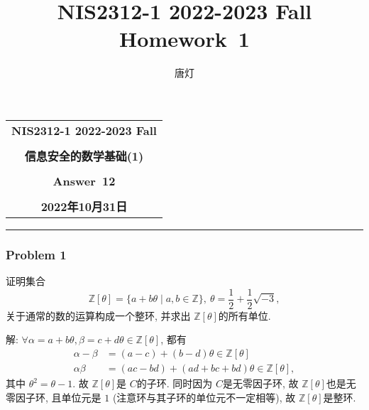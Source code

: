 \documentclass[a4paper,12pt]{ctexart}
\title{NIS2312-1 2022-2023 Fall Homework~1}
\author{唐灯}
\newcommand{\Z}{\mathbb{Z}}
\begin{document}
  \begin{center}

  \vspace{-0.3in}
  \begin{tabular}{c}
    \textbf{\Large NIS2312-1 2022-2023 Fall} \\
    \textbf{\Large  } \\
    \textbf{\Large  信息安全的数学基础(1)} \\
    \textbf{\Large  } \\
    \textbf{\Large  Answer~12} \\
    \textbf{\Large  } \\
    \textbf{\Large 2022年10月31日} \\
  \end{tabular}
  \end{center}
  \noindent
  \rule{\linewidth}{0.4pt}
  

\subsubsection*{Problem 1}
    证明集合
    \[\Z[\theta]=\{a+b\theta\mid a,b\in\Z\},~\theta=\frac{1}{2}+\frac{1}{2}\sqrt{-3},\]
    关于通常的数的运算构成一个整环, 并求出 $ \Z[\theta] $的所有单位.

    解: $ \forall \alpha=a+b\theta,\beta=c+d\theta\in\Z[\theta] $, 都有
    \begin{align*}
      \alpha-\beta&=(a-c) +(b-d)\theta\in\Z[\theta]\\
      \alpha\beta&=(ac-bd)+(ad+bc+bd)\theta\in\Z[\theta],
    \end{align*}
    其中 $ \theta^2=\theta-1 $. 故 $ \Z[\theta] $是 $ C $的子环. 同时因为 $ C $是无零因子环, 
    故 $ \Z[\theta] $也是无零因子环, 且单位元是 $ 1 $ (注意环与其子环的单位元不一定相等), 
    故 $ \Z[\theta] $是整环. 
\end{document}
